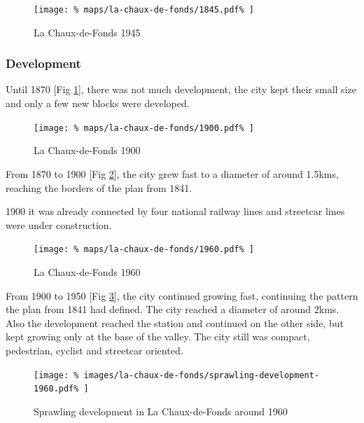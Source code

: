 \documentclass{article}
\begin{document}
\begin{multicols}{2}
			\begin{figure}[H]
				\texttt{[image: \%
					maps/la-chaux-de-fonds/1845.pdf\%
				]}
				\caption{La Chaux-de-Fonds 1945  \cite{MapGeoAdmin:LaChauxDeFonds}}
				\label{fig:map:la-chaux-de-fonds-1945}
			\end{figure}
			
			
			\subsubsection{Development}
			Until 1870 [Fig \ref{fig:map:la-chaux-de-fonds-1945}], there was not much development, the city kept their small size and only a few new blocks were developed.			
			
			\begin{figure}[H]
				\texttt{[image: \%
					maps/la-chaux-de-fonds/1900.pdf\%
				]}
				\caption{La Chaux-de-Fonds 1900  \cite{MapGeoAdmin:LaChauxDeFonds}}
				\label{fig:map:la-chaux-de-fonds-1900}
			\end{figure}
			
			From 1870 to 1900 [Fig \ref{fig:map:la-chaux-de-fonds-1900}], the city grew fast to a diameter of around 1.5kms, reaching the borders of the plan from 1841.
			
			1900 it was already connected by four national railway lines and streetcar lines were under construction.

			

			\begin{figure}[H]
				\texttt{[image: \%
					maps/la-chaux-de-fonds/1960.pdf\%
				]}
				\caption{La Chaux-de-Fonds 1960  \cite{MapGeoAdmin:LaChauxDeFonds}}
				\label{fig:map:la-chaux-de-fonds-1960}
			\end{figure}
			
			From 1900 to 1950 [Fig \ref{fig:map:la-chaux-de-fonds-1960}], the city continued growing fast, continuing the pattern the plan from 1841 had defined. The city reached a diameter of around 2kms. 
			Also the development reached the station and continued on the other side, but kept growing only at the base of the valley.
			The city still was compact, pedestrian, cyclist and streetcar oriented.
			
			
			\begin{figure}[H]
				\texttt{[image: \%
					images/la-chaux-de-fonds/sprawling-development-1960.pdf\%
				]}
				\caption{Sprawling development in La Chaux-de-Fonds around 1960 \cite{MapGeoAdmin:LaChauxDeFonds}}
				\label{fig:map:la-chaux-de-fonds-sprawling-development-1960}
			\end{figure}
			

\end{multicols}
\end{document}
